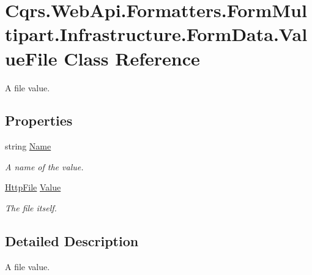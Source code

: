 \hypertarget{classCqrs_1_1WebApi_1_1Formatters_1_1FormMultipart_1_1Infrastructure_1_1FormData_1_1ValueFile}{}\section{Cqrs.\+Web\+Api.\+Formatters.\+Form\+Multipart.\+Infrastructure.\+Form\+Data.\+Value\+File Class Reference}
\label{classCqrs_1_1WebApi_1_1Formatters_1_1FormMultipart_1_1Infrastructure_1_1FormData_1_1ValueFile}


A file value.  


\subsection*{Properties}
\begin{DoxyCompactItemize}
\item 
string \hyperlink{classCqrs_1_1WebApi_1_1Formatters_1_1FormMultipart_1_1Infrastructure_1_1FormData_1_1ValueFile_a2410547f01c8ae8c6d5dd70d3f92284c_a2410547f01c8ae8c6d5dd70d3f92284c}{Name}
\begin{DoxyCompactList}\small\item\em A name of the value. \end{DoxyCompactList}\item 
\hyperlink{classCqrs_1_1WebApi_1_1Formatters_1_1FormMultipart_1_1Infrastructure_1_1HttpFile}{Http\+File} \hyperlink{classCqrs_1_1WebApi_1_1Formatters_1_1FormMultipart_1_1Infrastructure_1_1FormData_1_1ValueFile_aebbbefbeda7233acb846f54aaa2f26c2_aebbbefbeda7233acb846f54aaa2f26c2}{Value}
\begin{DoxyCompactList}\small\item\em The file itself. \end{DoxyCompactList}\end{DoxyCompactItemize}


\subsection{Detailed Description}
A file value. 



